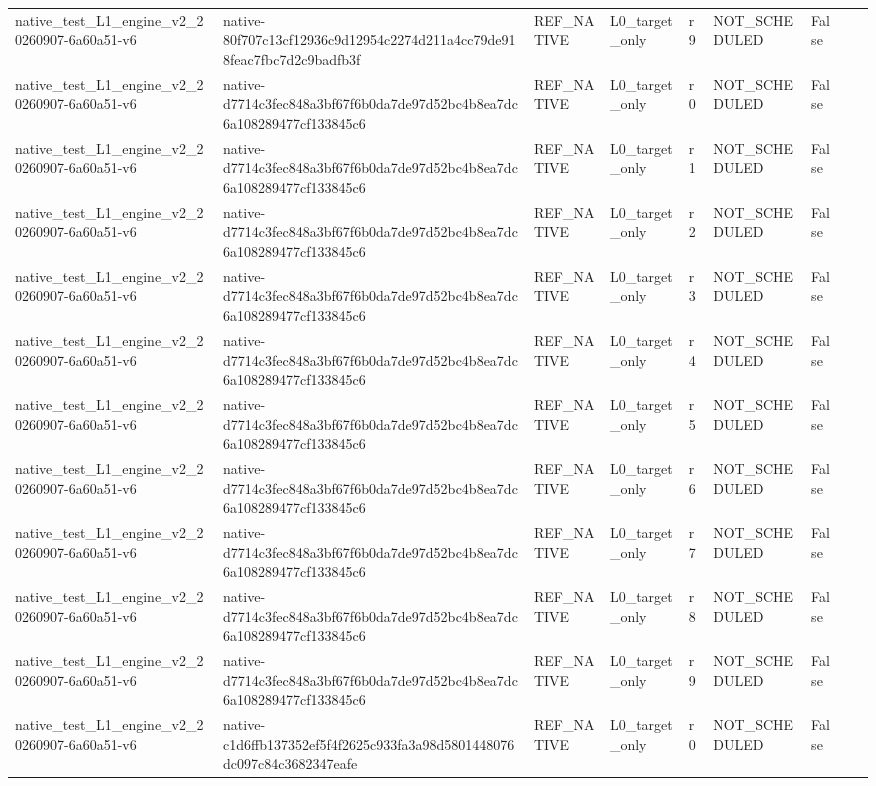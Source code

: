 \begin{tabular}{lllllllll}
native\_test\_L1\_engine\_v2\_20260907-6a60a51-v6 & native-80f707c13cf12936c9d12954c2274d211a4cc79de918feac7fbc7d2c9badfb3f & REF\_NATIVE & L0\_target\_only & r9 & NOT\_SCHEDULED & False &  &  \\
native\_test\_L1\_engine\_v2\_20260907-6a60a51-v6 & native-d7714c3fec848a3bf67f6b0da7de97d52bc4b8ea7dc6a108289477cf133845c6 & REF\_NATIVE & L0\_target\_only & r0 & NOT\_SCHEDULED & False &  &  \\
native\_test\_L1\_engine\_v2\_20260907-6a60a51-v6 & native-d7714c3fec848a3bf67f6b0da7de97d52bc4b8ea7dc6a108289477cf133845c6 & REF\_NATIVE & L0\_target\_only & r1 & NOT\_SCHEDULED & False &  &  \\
native\_test\_L1\_engine\_v2\_20260907-6a60a51-v6 & native-d7714c3fec848a3bf67f6b0da7de97d52bc4b8ea7dc6a108289477cf133845c6 & REF\_NATIVE & L0\_target\_only & r2 & NOT\_SCHEDULED & False &  &  \\
native\_test\_L1\_engine\_v2\_20260907-6a60a51-v6 & native-d7714c3fec848a3bf67f6b0da7de97d52bc4b8ea7dc6a108289477cf133845c6 & REF\_NATIVE & L0\_target\_only & r3 & NOT\_SCHEDULED & False &  &  \\
native\_test\_L1\_engine\_v2\_20260907-6a60a51-v6 & native-d7714c3fec848a3bf67f6b0da7de97d52bc4b8ea7dc6a108289477cf133845c6 & REF\_NATIVE & L0\_target\_only & r4 & NOT\_SCHEDULED & False &  &  \\
native\_test\_L1\_engine\_v2\_20260907-6a60a51-v6 & native-d7714c3fec848a3bf67f6b0da7de97d52bc4b8ea7dc6a108289477cf133845c6 & REF\_NATIVE & L0\_target\_only & r5 & NOT\_SCHEDULED & False &  &  \\
native\_test\_L1\_engine\_v2\_20260907-6a60a51-v6 & native-d7714c3fec848a3bf67f6b0da7de97d52bc4b8ea7dc6a108289477cf133845c6 & REF\_NATIVE & L0\_target\_only & r6 & NOT\_SCHEDULED & False &  &  \\
native\_test\_L1\_engine\_v2\_20260907-6a60a51-v6 & native-d7714c3fec848a3bf67f6b0da7de97d52bc4b8ea7dc6a108289477cf133845c6 & REF\_NATIVE & L0\_target\_only & r7 & NOT\_SCHEDULED & False &  &  \\
native\_test\_L1\_engine\_v2\_20260907-6a60a51-v6 & native-d7714c3fec848a3bf67f6b0da7de97d52bc4b8ea7dc6a108289477cf133845c6 & REF\_NATIVE & L0\_target\_only & r8 & NOT\_SCHEDULED & False &  &  \\
native\_test\_L1\_engine\_v2\_20260907-6a60a51-v6 & native-d7714c3fec848a3bf67f6b0da7de97d52bc4b8ea7dc6a108289477cf133845c6 & REF\_NATIVE & L0\_target\_only & r9 & NOT\_SCHEDULED & False &  &  \\
native\_test\_L1\_engine\_v2\_20260907-6a60a51-v6 & native-c1d6ffb137352ef5f4f2625c933fa3a98d5801448076dc097c84c3682347eafe & REF\_NATIVE & L0\_target\_only & r0 & NOT\_SCHEDULED & False &  &  \\

\end{tabular}
